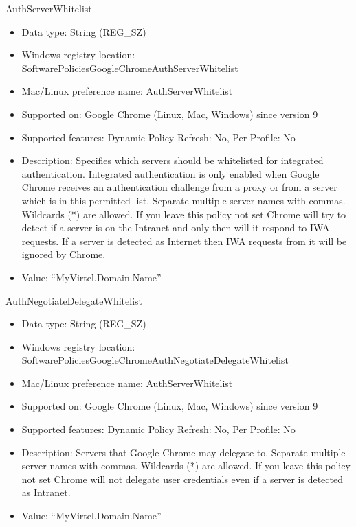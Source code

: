 \documentclass[letterpaper,10pt,english]{sphinxmanual}
\begin{document}
\sphinxAtStartPar
AuthServerWhitelist
\begin{itemize}
\item {} 
\sphinxAtStartPar
Data type: String (REG\_SZ)

\item {} 
\sphinxAtStartPar
Windows registry location: SoftwarePoliciesGoogleChromeAuthServerWhitelist

\item {} 
\sphinxAtStartPar
Mac/Linux preference name: AuthServerWhitelist

\item {} 
\sphinxAtStartPar
Supported on: Google Chrome (Linux, Mac, Windows) since version 9

\item {} 
\sphinxAtStartPar
Supported features: Dynamic Policy Refresh: No, Per Profile: No

\item {} 
\sphinxAtStartPar
Description: Specifies which servers should be whitelisted for integrated authentication. Integrated authentication is only enabled when Google Chrome receives an authentication challenge from a proxy or from a server which is in this permitted list. Separate multiple server names with commas. Wildcards (*) are allowed. If you leave this policy not set Chrome will try to detect if a server is on the Intranet and only then will it respond to IWA requests. If a server is detected as Internet then IWA requests from it will be ignored by Chrome.

\item {} 
\sphinxAtStartPar
Value: “MyVirtel.Domain.Name”

\end{itemize}

\sphinxAtStartPar
AuthNegotiateDelegateWhitelist
\begin{itemize}
\item {} 
\sphinxAtStartPar
Data type: String (REG\_SZ)

\item {} 
\sphinxAtStartPar
Windows registry location: SoftwarePoliciesGoogleChromeAuthNegotiateDelegateWhitelist

\item {} 
\sphinxAtStartPar
Mac/Linux preference name: AuthServerWhitelist

\item {} 
\sphinxAtStartPar
Supported on: Google Chrome (Linux, Mac, Windows) since version 9

\item {} 
\sphinxAtStartPar
Supported features: Dynamic Policy Refresh: No, Per Profile: No

\item {} 
\sphinxAtStartPar
Description: Servers that Google Chrome may delegate to. Separate multiple server names with commas. Wildcards (*) are allowed. If you leave this policy not set Chrome will not delegate user credentials even if a server is detected as Intranet.

\item {} 
\sphinxAtStartPar
Value: “MyVirtel.Domain.Name”

\end{itemize}
\end{document}
